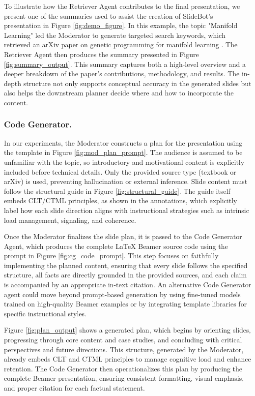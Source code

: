 \documentclass[letterpaper]{article} %
\begin{document}
To illustrate how the Retriever Agent contributes to the final presentation, we present one of the summaries used to assist the creation of SlideBot's presentation in Figure \ref{fig:demo_figure}. In this example, the topic "Manifold Learning" led the Moderator to generate targeted search keywords, which retrieved an arXiv paper on genetic programming for manifold learning \citep{lensen2021genetic}. The Retriever Agent then produces the summary presented in Figure \ref{fig:summary_output}. This summary captures both a high-level overview and a deeper breakdown of the paper’s contributions, methodology, and results. The in-depth structure not only supports conceptual accuracy in the generated slides but also helps the downstream planner decide where and how to incorporate the content.



\subsubsection{Code Generator.}

In our experiments, the Moderator constructs a plan for the presentation using the template in Figure \ref{fig:mod_plan_prompt}. The audience is assumed to be unfamiliar with the topic, so introductory and motivational content is explicitly included before technical details. Only the provided source type (textbook or arXiv) is used, preventing hallucination or external inference. Slide content must follow the structural guide in Figure \ref{fig:structural_guide}. The guide itself embeds CLT/CTML principles, as shown in the annotations, which explicitly label how each slide direction aligns with instructional strategies such as intrinsic load management, signaling, and coherence. 

Once the Moderator finalizes the slide plan, it is passed to the Code Generator Agent, which produces the complete \LaTeX{} Beamer source code using the prompt in Figure \ref{fig:cg_code_prompt}. This step focuses on faithfully implementing the planned content, ensuring that every slide follows the specified structure, all facts are directly grounded in the provided sources, and each claim is accompanied by an appropriate in-text citation. An alternative Code Generator agent could move beyond prompt-based generation by using fine-tuned models trained on high-quality Beamer examples or by integrating template libraries for specific instructional styles. 

Figure \ref{fig:plan_output} shows a generated plan, which begins by orienting slides, progressing through core content and case studies, and concluding with critical perspectives and future directions. This structure, generated by the Moderator, already embeds CLT and CTML principles to manage cognitive load and enhance retention. The Code Generator then operationalizes this plan by producing the complete Beamer presentation, ensuring consistent formatting, visual emphasis, and proper citation for each factual statement. 
\end{document}
